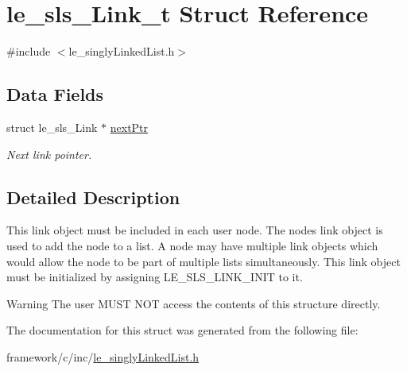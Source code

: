 \hypertarget{structle__sls___link__t}{}\section{le\+\_\+sls\+\_\+\+Link\+\_\+t Struct Reference}
\label{structle__sls___link__t}


{\ttfamily \#include $<$le\+\_\+singly\+Linked\+List.\+h$>$}

\subsection*{Data Fields}
\begin{DoxyCompactItemize}
\item 
\hypertarget{structle__sls___link__t_ab3b10ba398661c42032ece7720860ee2}{}struct le\+\_\+sls\+\_\+\+Link $\ast$ \hyperlink{structle__sls___link__t_ab3b10ba398661c42032ece7720860ee2}{next\+Ptr}\label{structle__sls___link__t_ab3b10ba398661c42032ece7720860ee2}

\begin{DoxyCompactList}\small\item\em Next link pointer. \end{DoxyCompactList}\end{DoxyCompactItemize}


\subsection{Detailed Description}
This link object must be included in each user node. The node\textquotesingle{}s link object is used to add the node to a list. A node may have multiple link objects which would allow the node to be part of multiple lists simultaneously. This link object must be initialized by assigning L\+E\+\_\+\+S\+L\+S\+\_\+\+L\+I\+N\+K\+\_\+\+I\+N\+I\+T to it.

\begin{DoxyWarning}{Warning}
The user M\+U\+S\+T N\+O\+T access the contents of this structure directly. 
\end{DoxyWarning}


The documentation for this struct was generated from the following file\+:\begin{DoxyCompactItemize}
\item 
framework/c/inc/\hyperlink{le__singly_linked_list_8h}{le\+\_\+singly\+Linked\+List.\+h}\end{DoxyCompactItemize}
